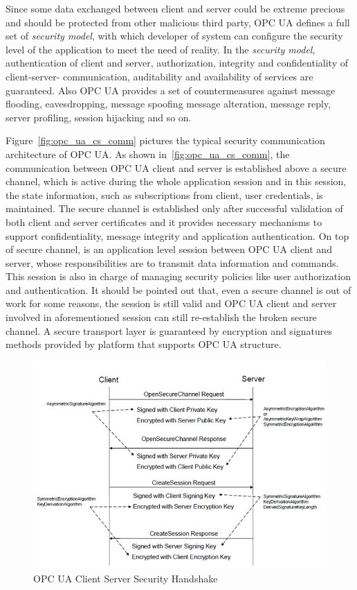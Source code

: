 \documentclass[]{llncs}
\begin{document}
Since some data exchanged between client and server could be extreme precious and should be protected from other malicious third party, OPC UA defines a full set of  \emph{security model}, with which developer of system can configure the security level of the application to meet the need of reality. In the  \emph{security model}, authentication of client and server, authorization, integrity and confidentiality of client-server- communication, auditability and availability of services are guaranteed. Also OPC UA provides a set of countermeasures against message flooding, eavesdropping, message spoofing message alteration, message reply, server profiling, session hijacking and so on\cite{O2}.


Figure~\ref{fig:opc_ua_cs_comm} pictures the typical security communication architecture of OPC UA. As shown in~\ref{fig:opc_ua_cs_comm}, the communication between OPC UA client and server is established above a secure channel, which is active during the whole application session and in this session, the state information, such as subscriptions from client, user credentials, is maintained. The secure channel is established only after successful validation of both client and server certificates and it provides necessary mechanisms to support confidentiality, message integrity and application authentication. On top of secure channel, is an application level session between OPC UA client and server, whose responsibilities are to transmit data information and commands. This session is also in charge of managing security policies like user authorization and authentication. It should be pointed out that, even a secure channel is out of work for some reasons, the session is still valid and OPC UA client and server involved in aforementioned session can still re-establish the broken secure channel. A secure transport layer is guaranteed by encryption and signatures methods provided by platform that supports OPC UA structure.

\begin{figure}[!htbp]
	\centering
	\includegraphics[width=1\textwidth]{opc_ua_shs.jpg}
		\caption[ ]{OPC UA Client Server Security Handshake\cite{O2}}
	\label{fig:opc_ua_cs_shs}
\end{figure}
\end{document}
